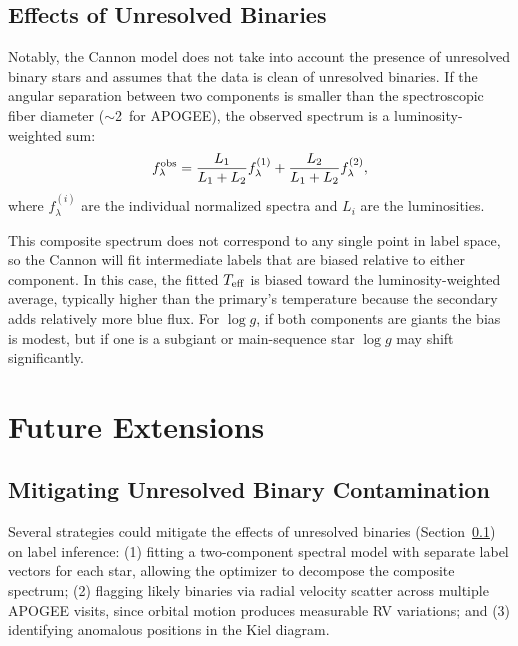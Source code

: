 \documentclass[10pt,preprint2]{aastex}
\begin{document}
\subsection{Effects of Unresolved Binaries}
\label{sec:binaries}

Notably, the Cannon model does not take into account the presence of unresolved binary stars and assumes that the data is clean of unresolved binaries. If the angular separation between two components is smaller than the spectroscopic fiber diameter ($\sim$2\arcsec\ for APOGEE), the observed spectrum is a luminosity-weighted sum:
\begin{equation}
  f_\lambda^{\rm obs} = \frac{L_1}{L_1 + L_2} f_\lambda^{(1)} + \frac{L_2}{L_1 + L_2} f_\lambda^{(2)},
\end{equation}
where $f_\lambda^{(i)}$ are the individual normalized spectra and $L_i$ are the luminosities.

This composite spectrum does not correspond to any single point in label space, so the Cannon will fit intermediate labels that are biased relative to either component. In this case, the fitted $T_{\rm eff}$ is biased toward the luminosity-weighted average, typically higher than the primary's temperature because the secondary adds relatively more blue flux. For $\log g$, if both components are giants the bias is modest, but if one is a subgiant or main-sequence star $\log g$ may shift significantly. 

\section{Future Extensions}
\label{sec:future}

\subsection{Mitigating Unresolved Binary Contamination}

Several strategies could mitigate the effects of unresolved binaries (Section~\ref{sec:binaries}) on label inference: (1) fitting a two-component spectral model with separate label vectors for each star, allowing the optimizer to decompose the composite spectrum; (2) flagging likely binaries via radial velocity scatter across multiple APOGEE visits, since orbital motion produces measurable RV variations; and (3) identifying anomalous positions in the Kiel diagram.
\end{document}
